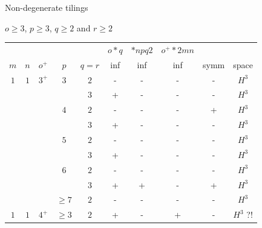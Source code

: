 \begin{frame}
  Non-degenerate tilings

  \tiny
  $o\geq3$, $p\geq3$, $q\geq2$ and $r\geq2$

  \begin{tabular}{|cccccccccc|}
    \hline
    & & & & & $o*q$ & $*npq2$ & $o^+*2mn$ & & \\
    $m$ & $n$ & $o^+$ & $p$ & $q=r$ & inf & inf & inf & symm & space \\
    \hline
    $1$ & $1$ & $3^+$ & $3$ & $2$ & - & - & - & - & $H^3$ \\
    & & & & $3$ & + & - & - & - & $H^3$ \\
    & & & $4$ & $2$ & - & - & - & + & $H^3$ \\
    & & & & $3$ & + & - & - & - & $H^3$ \\
    & & & $5$ & $2$ & - & - & - & - & $H^3$ \\
    & & & & $3$ & + & - & - & - & $H^3$ \\
    & & & $6$ & $2$ & - & - & - & - & $H^3$ \\
    & & & & $3$ & + & + & - & + & $H^3$ \\
    & & & $\geq7$ & $2$ & - & - & - & - & $H^3$ \\
    \hline
    $1$ & $1$ & $4^+$ & $\geq3$ & $2$ & + & - & + & - & $H^3$ ?! \\
    \hline
  \end{tabular}
\end{frame}

